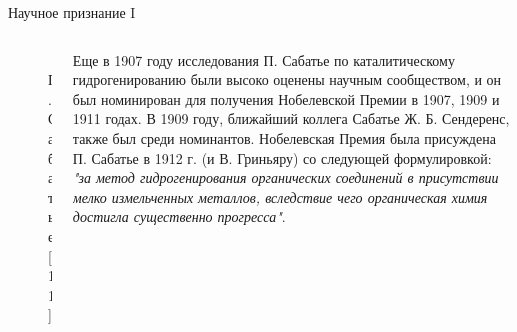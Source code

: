 \documentclass[hyperref={pdfpagelabel=false},usepdftitle=false,xcolor=dvipsnames]{beamer}
\begin{document}
\begin{frame}{Научное признание I}
		\begin{columns}
\begin{column}{0.4\textwidth}
\begin{figure}
	\includegraphics[width=0.8\linewidth]{pictures/sabatier.jpg}
	\caption{П. Сабатье [11]}
\end{figure}
\end{column}
\begin{column}{0.6\linewidth}
		Еще в 1907 году исследования П. Сабатье по каталитическому гидрогенированию были высоко оценены научным сообществом, и он был номинирован для получения Нобелевской Премии в 1907, 1909 и 1911 годах. В 1909 году, ближайший коллега Сабатье Ж. Б. Сендеренс, также был среди номинантов. Нобелевская Премия была присуждена П. Сабатье в 1912 г. (и В. Гриньяру) со следующей формулировкой: \textit{"за метод гидрогенирования органических соединений в присутствии мелко измельченных металлов, вследствие чего органическая химия достигла существенно прогресса"}. 
\end{column}
\end{columns}
\end{frame}
\end{document}
